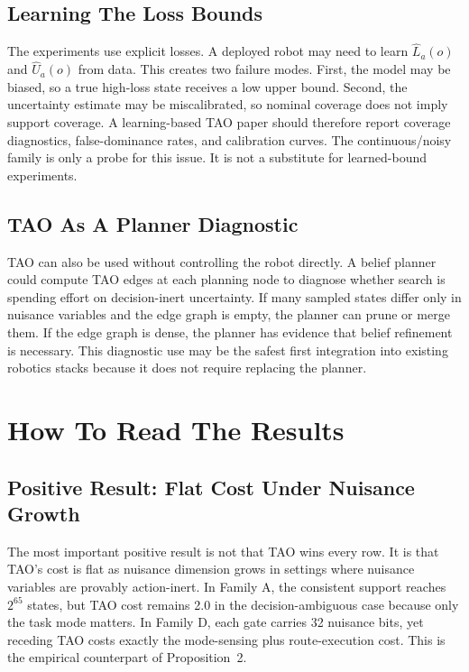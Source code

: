 \documentclass{article}
\begin{document}
\subsection{Learning The Loss Bounds}

The experiments use explicit losses. A deployed robot may need to learn $\hat{L}_a(o)$ and $\hat{U}_a(o)$ from data. This creates two failure modes. First, the model may be biased, so a true high-loss state receives a low upper bound. Second, the uncertainty estimate may be miscalibrated, so nominal coverage does not imply support coverage. A learning-based TAO paper should therefore report coverage diagnostics, false-dominance rates, and calibration curves. The continuous/noisy family is only a probe for this issue. It is not a substitute for learned-bound experiments.

\subsection{TAO As A Planner Diagnostic}

TAO can also be used without controlling the robot directly. A belief planner could compute TAO edges at each planning node to diagnose whether search is spending effort on decision-inert uncertainty. If many sampled states differ only in nuisance variables and the edge graph is empty, the planner can prune or merge them. If the edge graph is dense, the planner has evidence that belief refinement is necessary. This diagnostic use may be the safest first integration into existing robotics stacks because it does not require replacing the planner.

\section{How To Read The Results}

\subsection{Positive Result: Flat Cost Under Nuisance Growth}

The most important positive result is not that TAO wins every row. It is that TAO's cost is flat as nuisance dimension grows in settings where nuisance variables are provably action-inert. In Family A, the consistent support reaches $2^{65}$ states, but TAO cost remains 2.0 in the decision-ambiguous case because only the task mode matters. In Family D, each gate carries 32 nuisance bits, yet receding TAO costs exactly the mode-sensing plus route-execution cost. This is the empirical counterpart of Proposition~2.
\end{document}
